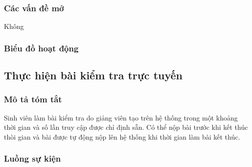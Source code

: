\documentclass[./../main_file.tex]{subfiles}
\begin{document}
\subsubsection{Các vấn đề mở}
Không

\subsubsection{Biểu đồ hoạt động}

\subsection{Thực hiện bài kiểm tra trực tuyến}
\subsubsection{Mô tả tóm tắt}
Sinh viên làm bài kiểm tra do giảng viên tạo trên hệ thống trong một khoảng thời gian và số lần truy cập được chỉ định sẵn. Có thể nộp bài trước khi kết thúc thòi gian và bài được tự động nộp lên hệ thống khi thời gian làm bài kết thúc.

\subsubsection{Luồng sự kiện}
\end{document}

